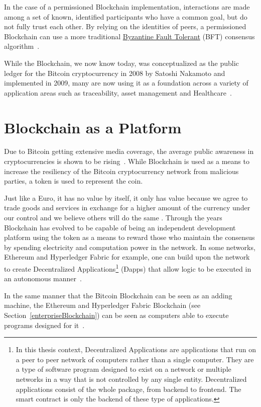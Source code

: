 In the case of a permissioned Blockchain implementation, interactions are made
among a set of known, identified participants who have a common goal, but do
not fully trust each other. By relying on the identities of peers, a
permissioned Blockchain can use a more traditional
\href{https://en.wikipedia.org/wiki/Byzantine_fault_tolerance}{Byzantine Fault
Tolerant} (BFT) consensus algorithm~\cite{Sousa2018}.

While the Blockchain, we now know today, was conceptualized as the public
ledger for the Bitcoin cryptocurrency in 2008 by Satoshi Nakamoto and
implemented in 2009, many are now using it as a foundation across a variety of
application areas such as traceability, asset management and
Healthcare~\cite{MIT2016}.

\section{Blockchain as a Platform} \label{blockchainasaPlatform}

Due to Bitcoin getting extensive media coverage, the average public awareness
in cryptocurrencies is shown to be rising~\cite{BitAwareness2017}. While
Blockchain is used as a means to increase the resiliency of the Bitcoin
cryptocurrency network from malicious parties, a token is used to represent the
coin. 

Just like a Euro, it has no value by itself, it only has value because we agree
to trade goods and services in exchange for a higher amount of the currency
under our control and we believe others will do the same \cite{aliessi2016}.
Through the years Blockchain has evolved to be capable of being an independent
development platform using the token as a means to reward those who maintain
the consensus by spending electricity and computation power in the network. In
some networks, Ethereum and Hyperledger Fabric for example, one can build upon
the network to create Decentralized Applications\footnote{In this thesis
context, Decentralized Applications are applications that run on a peer to peer
network of computers rather than a single computer. They are a type of software
program designed to exist on a network or multiple networks in a way that is
not controlled by any single entity. Decentralized applications consist of the
whole package, from backend to frontend. The smart contract is only the backend
of these type of applications.} (Ðapps) that allow logic to be executed in an
autonomous manner~\cite{Wood2017}. 

In the same manner that the Bitcoin Blockchain can be seen as an adding
machine, the Ethereum and Hyperledger Fabric Blockchain (see
Section~\ref{enterpriseBlockchain}) can be seen as computers able to execute
programs designed for it~\cite{Wood2015}.

